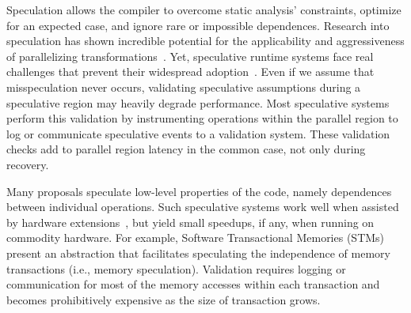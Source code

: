 Speculation allows the compiler to overcome static analysis' constraints,
optimize for an expected
case, and ignore rare or impossible dependences.  Research into speculation has
shown incredible potential for the applicability and aggressiveness of
parallelizing transformations~\cite{zhong:08:hpca, johnson:12:pldi:short}.
%
Yet, speculative runtime systems face real challenges that prevent their
widespread adoption~\cite{cascaval:08:stmtoy:short}.
Even if we assume
that misspeculation never occurs, validating speculative assumptions during
a speculative region may heavily degrade performance.
%
Most speculative systems perform this validation by instrumenting operations
within the parallel region to log or communicate speculative events to a
validation system.  These validation checks add to parallel region latency in
the common case, not only during recovery.

Many proposals speculate low-level properties of the code, namely dependences
between individual operations.
%
Such speculative systems work well when assisted by hardware
extensions~\cite{TLS papers...}, but yield small speedups, if any, when
running on commodity hardware.
For example, Software Transactional Memories
(STMs)~\cite{mehrara:09:stmlite} present an abstraction that facilitates
speculating the independence of memory transactions (i.e., memory
speculation). Validation requires logging or communication for most of the
memory accesses within each transaction and becomes prohibitively expensive
as the size of transaction grows.
%

